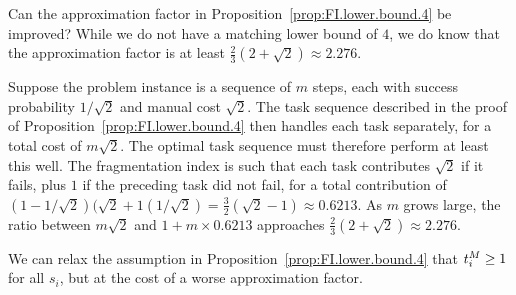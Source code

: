 Can the approximation factor in Proposition~\ref{prop:FI.lower.bound.4} be improved? 
While we do not have a matching lower bound of $4$, we do know that the approximation factor is at least $\tfrac{2}{3}(2+\sqrt{2}) \approx 2.276$.  

\begin{example}
\label{ex:FI.approx.not.2}
Suppose the problem instance is a sequence of $m$ steps, each with success probability $1/\sqrt{2}$ and manual cost $\sqrt{2}$.  
The task sequence described in the proof of Proposition~\ref{prop:FI.lower.bound.4} then handles each task separately, for a total cost of $m \sqrt{2}$.  
The optimal task sequence must therefore perform at least this well.  
The fragmentation index is such that each task contributes $\sqrt{2}$ if it fails, plus $1$ if the preceding task did not fail, for a total contribution of $(1-1/\sqrt{2})(\sqrt{2} + 1(1/\sqrt{2}) = \tfrac{3}{2}(\sqrt{2}-1) \approx 0.6213$.  
As $m$ grows large, the ratio between $m\sqrt{2}$ and $1 + m \times 0.6213$ approaches $\tfrac{2}{3}(2+\sqrt{2}) \approx 2.276$.
\end{example}

We can relax the assumption in Proposition~\ref{prop:FI.lower.bound.4} that $t^{M}_{i} \geq 1$ for all $s_i$, but at the cost of a worse approximation factor.

